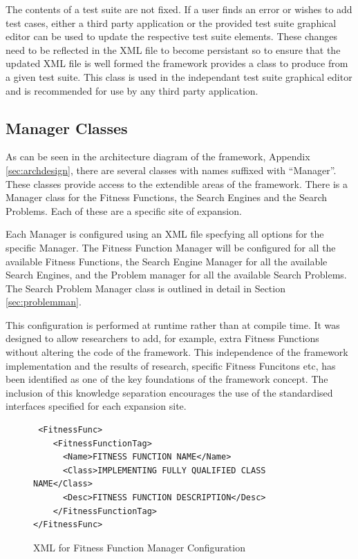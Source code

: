 The contents of a test suite are not fixed.
If a user finds an error or wishes to add test cases, either a third party application or the provided test suite graphical editor can be used to update the respective test suite elements.
These changes need to be reflected in the XML file to become persistant so to ensure that the updated XML file is well formed the framework provides a class to produce from a given test suite.
This class is used in the independant test suite graphical editor and is recommended for use by any third party application.

\subsection{Manager Classes}
\label{sec:manclasses}
As can be seen in the architecture diagram of the framework, Appendix \ref{sec:archdesign}, there are several classes with names suffixed with ``Manager''.
These classes provide access to the extendible areas of the framework.
There is a Manager class for the Fitness Functions, the Search Engines and the Search Problems.
Each of these are a specific site of expansion.

Each Manager is configured using an XML file specfying all options for the specific Manager.
The Fitness Function Manager will be configured for all the available Fitness Functions, the Search Engine Manager for all the available Search Engines, and the Problem manager for all the available Search Problems.
The Search Problem Manager class is outlined in detail in Section \ref{sec:problemman}.

This configuration is performed at runtime rather than at compile time.
It was designed to allow researchers to add, for example, extra Fitness Functions without altering the code of the framework.
This independence of the framework implementation and the results of research, specific Fitness Funcitons etc, has been identified as one of the key foundations of the framework concept.
The inclusion of this knowledge separation encourages the use of the standardised interfaces specified for each expansion site.

\lstset{language=XML}
\begin{figure}
\begin{lstlisting}
 <FitnessFunc>
	<FitnessFunctionTag>
	  <Name>FITNESS FUNCTION NAME</Name>
	  <Class>IMPLEMENTING FULLY QUALIFIED CLASS NAME</Class>
	  <Desc>FITNESS FUNCTION DESCRIPTION</Desc>
	</FitnessFunctionTag>
</FitnessFunc>
\end{lstlisting}
\caption{XML for Fitness Function Manager Configuration}
\label{code:fitfuntmanconfig}
\end{figure}


